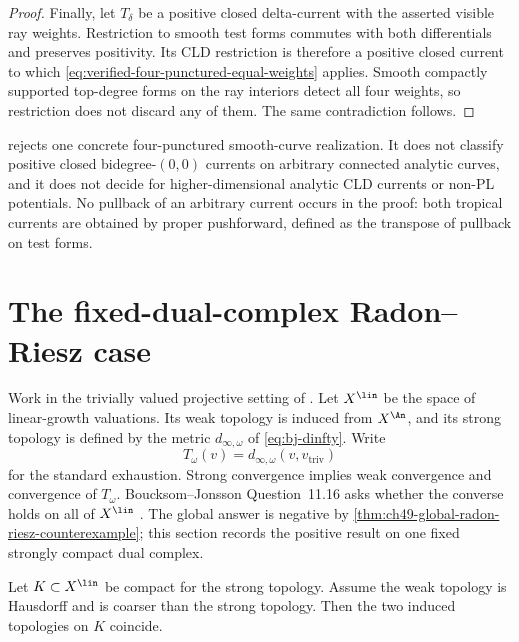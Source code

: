 \begin{proof}
Finally, let \(T_\delta\) be a positive closed delta-current with the
asserted visible ray weights.  Restriction to smooth test forms commutes
with both differentials and preserves positivity.  Its CLD restriction is
therefore a positive closed current to which
\eqref{eq:verified-four-punctured-equal-weights} applies.  Smooth compactly
supported top-degree forms on the ray interiors detect all four weights, so
restriction does not discard any of them.  The same contradiction follows.
\end{proof}

\begin{remark}
\label{rem:verified-four-punctured-scope}
 rejects one concrete
four-punctured smooth-curve realization.  It does not classify positive
closed bidegree-$(0,0)$ currents on arbitrary connected analytic curves,
and it does not decide  for
higher-dimensional analytic CLD currents or non-PL potentials.  No pullback
of an arbitrary current occurs in the proof: both tropical currents are
obtained by proper pushforward, defined as the transpose of pullback on test
forms.
\end{remark}

\section{The fixed-dual-complex Radon--Riesz case}
\label{sec:verified-fixed-complex}

Work in the trivially valued projective setting of
. Let $X^{\lin}$ be the space of
linear-growth valuations. Its weak topology is induced from
$X^{\An}$, and its strong topology is defined by the metric
$d_{\infty,\omega}$ of \eqref{eq:bj-dinfty}. Write
\[
                  T_\omega(v)
                  =d_{\infty,\omega}(v,v_{\mathrm{triv}})
\tag{69.14}\label{eq:verified-exhaustion}
\]
for the standard exhaustion. Strong convergence implies weak
convergence and convergence of $T_\omega$. Boucksom--Jonsson
Question~11.16 asks whether the converse holds on all of $X^{\lin}$
\cite{BJ22}.  The global answer is negative by
\cref{thm:ch49-global-radon-riesz-counterexample}; this section records the
positive result on one fixed strongly compact dual complex.

\begin{lemma}\label{lem:verified-compact-hausdorff}
Let $K\subset X^{\lin}$ be compact for the strong topology.
Assume the weak topology is Hausdorff and is coarser than the strong
topology. Then the two induced topologies on $K$ coincide.
\end{lemma}

